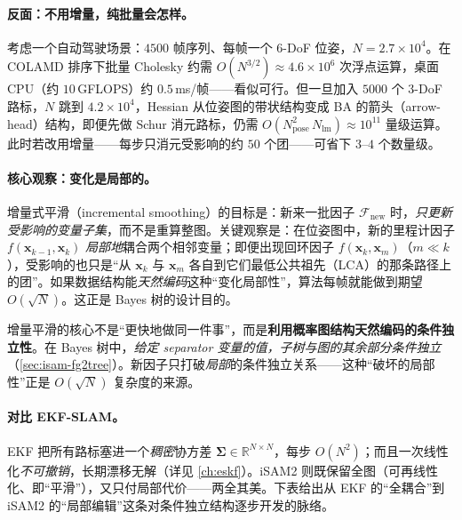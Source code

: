 \paragraph{反面：不用增量，纯批量会怎样。}
考虑一个自动驾驶场景：$4500$ 帧序列、每帧一个 $6$-DoF 位姿，$N=2.7\times10^4$。在 COLAMD 排序下批量 Cholesky 约需 $O(N^{3/2})\approx 4.6\times10^6$ 次浮点运算，桌面 CPU（约 $10$\,GFLOPS）约 $0.5$\,ms/帧——看似可行。但一旦加入 $5000$ 个 $3$-DoF 路标，$N$ 跳到 $4.2\times10^4$，Hessian 从位姿图的带状结构变成 BA 的箭头（arrow-head）结构，即便先做 Schur 消元路标，仍需 $O(N_{\text{pose}}^2\,N_{\text{lm}})\approx 10^{11}$ 量级运算。此时若改用增量——每步只消元受影响的约 $50$ 个团——可省下 $3$--$4$ 个数量级。

\paragraph{核心观察：变化是局部的。}
增量式平滑（incremental smoothing）的目标是：新来一批因子 $\mathcal{F}_{\text{new}}$ 时，\emph{只更新受影响的变量子集}，而不是重算整图。关键观察是：在位姿图中，新的里程计因子 $f(\mathbf{x}_{k-1},\mathbf{x}_k)$ \emph{局部地}耦合两个相邻变量；即便出现回环因子 $f(\mathbf{x}_k,\mathbf{x}_m)$（$m\ll k$），受影响的也只是“从 $\mathbf{x}_k$ 与 $\mathbf{x}_m$ 各自到它们最低公共祖先（LCA）的那条路径上的团”。如果数据结构能\emph{天然编码}这种“变化局部性”，算法每帧就能做到期望 $O(\sqrt N)$。这正是 Bayes 树的设计目的。

\begin{insight}[增量平滑的本质]
增量平滑的核心不是“更快地做同一件事”，而是\textbf{利用概率图结构天然编码的条件独立性}。在 Bayes 树中，\emph{给定 separator 变量的值，子树与图的其余部分条件独立}（\cref{sec:isam-fg2tree}）。新因子只打破\emph{局部}的条件独立关系——这种“破坏的局部性”正是 $O(\sqrt N)$ 复杂度的来源。
\end{insight}

\paragraph{对比 EKF-SLAM。}
EKF 把所有路标塞进一个\emph{稠密}协方差 $\boldsymbol{\Sigma}\in\mathbb{R}^{N\times N}$，每步 $O(N^2)$；而且一次线性化\emph{不可撤销}，长期漂移无解（详见 \cref{ch:eskf}）。iSAM2 则既保留全图（可再线性化、即“平滑”），又只付局部代价——两全其美。下表给出从 EKF 的“全耦合”到 iSAM2 的“局部编辑”这条对条件独立结构逐步开发的脉络\cite{smith1986estimating,dellaert2006square,kaess2008isam,kaess2010bayestree,kaess2012isam2}。

